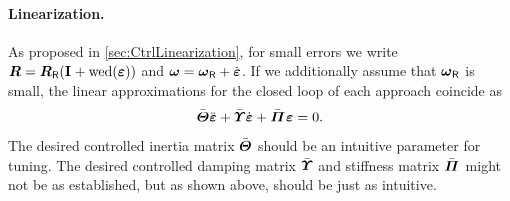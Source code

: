 \paragraph{Linearization.}
As proposed in \autoref{sec:CtrlLinearization}, for small errors we write $\boldsymbol{R} = \boldsymbol{R}_{\mathsf{R}}(\boldsymbol{\mathrm{I}}_{} + \operatorname{wed}(\boldsymbol{\varepsilon}))$ and $\boldsymbol{\omega} = \boldsymbol{\omega}_{\mathsf{R}} + \dot{\boldsymbol{\varepsilon}}$.
If we additionally assume that $\boldsymbol{\omega}_{\mathsf{R}}$ is small, the linear approximations for the closed loop of each approach coincide as
\begin{align}
 \Jc \LinErrorCoorddd + \sigc \LinErrorCoordd + \kapc \LinErrorCoord = 0.
\end{align}
The desired controlled inertia matrix $\bar{\boldsymbol{\varTheta}}$ should be an intuitive parameter for tuning.
The desired controlled damping matrix $\bar{\boldsymbol{\varUpsilon}}$ and stiffness matrix $\kapc$ might not be as established, but as shown above, should be just as intuitive. 